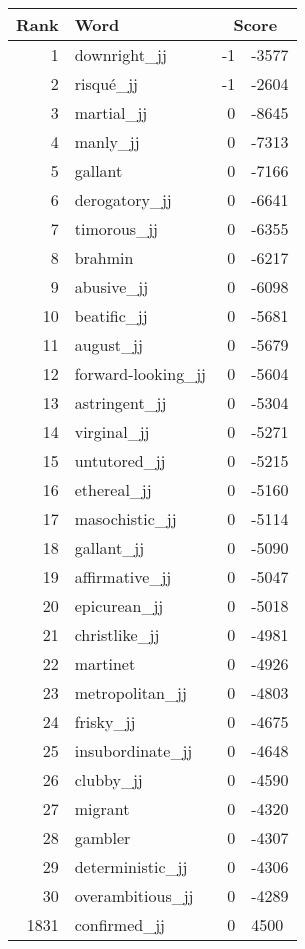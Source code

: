 \begin{longtable}[!htbp]{| rlr@{.}l |}
    \hline
    \textbf{Rank} & \textbf{Word} & \multicolumn{2}{c|}{\textbf{Score}} \\
    \hline
    \endhead
    1 & downright\_jj & -1 & -3577 \\
    2 & risqué\_jj & -1 & -2604 \\
    3 & martial\_jj & 0 & -8645 \\
    4 & manly\_jj & 0 & -7313 \\
    5 & gallant & 0 & -7166 \\
    6 & derogatory\_jj & 0 & -6641 \\
    7 & timorous\_jj & 0 & -6355 \\
    8 & brahmin & 0 & -6217 \\
    9 & abusive\_jj & 0 & -6098 \\
    10 & beatific\_jj & 0 & -5681 \\
    11 & august\_jj & 0 & -5679 \\
    12 & forward-looking\_jj & 0 & -5604 \\
    13 & astringent\_jj & 0 & -5304 \\
    14 & virginal\_jj & 0 & -5271 \\
    15 & untutored\_jj & 0 & -5215 \\
    16 & ethereal\_jj & 0 & -5160 \\
    17 & masochistic\_jj & 0 & -5114 \\
    18 & gallant\_jj & 0 & -5090 \\
    19 & affirmative\_jj & 0 & -5047 \\
    20 & epicurean\_jj & 0 & -5018 \\
    21 & christlike\_jj & 0 & -4981 \\
    22 & martinet & 0 & -4926 \\
    23 & metropolitan\_jj & 0 & -4803 \\
    24 & frisky\_jj & 0 & -4675 \\
    25 & insubordinate\_jj & 0 & -4648 \\
    26 & clubby\_jj & 0 & -4590 \\
    27 & migrant & 0 & -4320 \\
    28 & gambler & 0 & -4307 \\
    29 & deterministic\_jj & 0 & -4306 \\
    30 & overambitious\_jj & 0 & -4289 \\
    1831 & confirmed\_jj & 0 & 4500 \\

\end{longtable}

